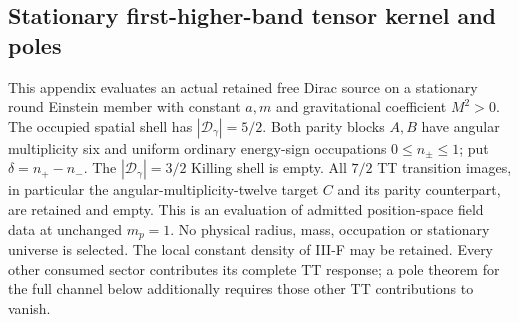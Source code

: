 \documentclass[12pt,a4paper]{article}
\begin{document}
\subsection{Stationary first-higher-band tensor kernel and poles}
\label{p8:app:stationary-first-tt-source}
This appendix evaluates an actual retained free Dirac source on a stationary
round Einstein member with constant $a,m$ and gravitational coefficient
$M^2>0$. The occupied spatial shell has $|\mathcal D_\gamma|=5/2$.
Both parity blocks $A,B$ have angular multiplicity six and uniform ordinary
energy-sign occupations $0\le n_\pm\le1$; put $\delta=n_+-n_-$.
The $|\mathcal D_\gamma|=3/2$ Killing shell is empty. All $7/2$ TT
transition images, in particular the angular-multiplicity-twelve target
$C$ and its parity counterpart, are retained and empty. This is an
evaluation of admitted position-space field data at unchanged $m_p=1$.
No physical radius, mass, occupation or stationary universe is selected.
The local constant density of III-F may be retained. Every other consumed
sector contributes its complete TT response; a pole theorem for the full
channel below additionally requires those other TT contributions to vanish.
\end{document}
